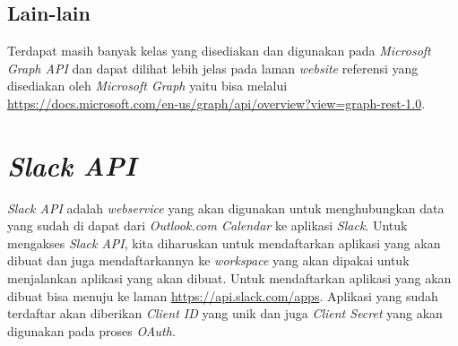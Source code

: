 \subsection{Lain-lain}
Terdapat masih banyak kelas yang disediakan dan digunakan pada \textit{Microsoft Graph API} dan dapat dilihat lebih jelas pada laman \textit{website} referensi yang disediakan oleh \textit{Microsoft Graph} yaitu bisa melalui \url{https://docs.microsoft.com/en-us/graph/api/overview?view=graph-rest-1.0}. 

\section{\textit{Slack API}}
\label{sec:slack}
\textit{Slack API} adalah \textit{webservice} yang akan digunakan untuk menghubungkan data yang sudah di dapat dari \textit{Outlook.com Calendar} ke aplikasi \textit{Slack}.\cite{slack} Untuk mengakses \textit{Slack API}, kita diharuskan untuk mendaftarkan aplikasi yang akan dibuat dan juga mendaftarkannya ke \textit{workspace} yang akan dipakai untuk menjalankan aplikasi yang akan dibuat. Untuk mendaftarkan aplikasi yang akan dibuat bisa menuju ke laman \url{https://api.slack.com/apps}. Aplikasi yang sudah terdaftar akan diberikan \textit{Client ID} yang unik dan juga \textit{Client Secret} yang akan digunakan pada proses \textit{OAuth}. 

